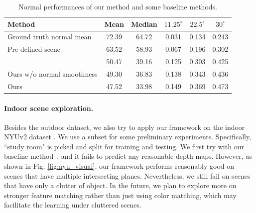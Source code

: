 

\begin{table}[t] \small
\centering
\caption{Normal performances of our method and some baseline methods.}
\label{tbl:normal}
\fontsize{6.5}{7}\selectfont
\bgroup
\def\arraystretch{1.2}
\begin{tabular}{l|c|c|c|c|c}
\thickhline
Method                        & Mean  & Median & $11.25^{\circ}$ & $22.5^{\circ}$  & $30^{\circ}$    \\ \hline
Ground truth normal mean      & 72.39 & 64.72  & 0.031 & 0.134 & 0.243 \\
Pre-defined scene             & 63.52 & 58.93  & 0.067 & 0.196 & 0.302 \\
\cite{zhou2017unsupervised} & 50.47 & 39.16  & 0.125 & 0.303 & 0.425 \\
Ours w/o normal smoothness    & 49.30 & 36.83  & 0.138 & 0.343 & 0.436 \\
Ours                          & 47.52 & 33.98  & 0.149 & 0.369 & 0.473 \\ \hline
\end{tabular}
\egroup
\vspace{-1.0\baselineskip}
\end{table}


\vspace{-0.7\baselineskip}
\paragraph{Indoor scene exploration.}
Besides the outdoor dataset, we also try to apply our framework on the indoor NYUv2 dataset \cite{silberman2012indoor}. We use a subset for some preliminary experiments. Specifically, ``study room" is picked and split for training and testing. We first try with our baseline method~\cite{zhou2017unsupervised}, and it fails to predict any reasonable depth maps. However, as shown in Fig. \ref{fig:nyu_visual}, our framework performs reasonably good on scenes that have multiple intersecting planes. Nevertheless, we still fail on scenes that have only a clutter of object. In the future, we plan to explore more on stronger feature matching rather than just using color matching, which may facilitate the learning under cluttered scenes.

